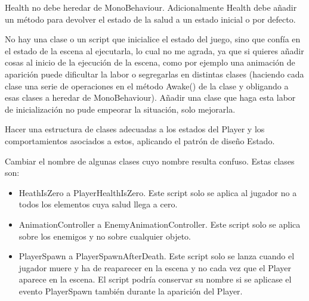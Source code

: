 Health no debe heredar de MonoBehaviour. Adicionalmente Health debe añadir un método para devolver el estado de la salud a un estado inicial o por defecto. 

No hay una clase o un script que inicialice el estado del juego, sino que confía en el estado de la escena al ejecutarla, lo cual no me agrada, ya que si quieres añadir cosas al inicio de la ejecución de la escena, como por ejemplo una animación de aparición puede dificultar la labor o segregarlas en distintas clases (haciendo cada clase una serie de operaciones en el método Awake() de la clase y obligando a esas clases a heredar de MonoBehaviour). Añadir una clase que haga esta labor de inicialización no pude empeorar la situación, solo mejorarla. 

Hacer una estructura de clases adecuadas a los estados del Player y los comportamientos asociados a estos, aplicando el patrón de diseño Estado. 

Cambiar el nombre de algunas clases cuyo nombre resulta confuso. Estas clases son: 
\begin{itemize}
\item
HeathIsZero a PlayerHealthIsZero. Este script solo se aplica al jugador no a todos los elementos cuya salud llega a cero. 
\item
AnimationController a EnemyAnimationController. Este script solo se aplica sobre los enemigos y no sobre cualquier objeto. 
\item
PlayerSpawn a PlayerSpawnAfterDeath. Este script solo se lanza cuando el jugador muere y ha de reaparecer en la escena y no cada vez que el Player aparece en la escena. El script podría conservar su nombre si se aplicase el evento PlayerSpawn también durante la aparición del Player.
\end{itemize}

